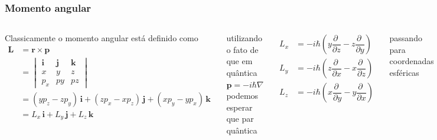 \documentclass[12pt,brazil,table]{beamer}
\begin{document}
  


\begin{frame}
  \frametitle{Momento angular}
  \fontsize{7pt}{11pt}\selectfont

  
  \begin{columns}[T]

   Classicamente o momento angular está definido como
   \vspace*{-0.5cm}
   \begin{align*}
            \mathbf{L} &= \mathbf{r} \times \mathbf{p}\\
            &= \begin{vmatrix}
              \mathbf{i} & \mathbf{j} & \mathbf{k}\\
              x & y & z\\
              p_x & py & pz
            \end{vmatrix}\\
            &= \left( yp_z - zp_y \right)\,\mathbf{i} + \left( zp_x - xp_z \right)\,\mathbf{j} + \left( xp_y - yp_x \right)\,\mathbf{k}\\
            &= L_x\,\mathbf{i} +L_y \,\mathbf{j} +L_z \,\mathbf{k}
    \end{align*}
    
    utilizando o fato de que em quântica $\mathbf{p} = -i\hbar \nabla$ podemos esperar que par quântica
    
    \[
     \begin{align*}
            L_x &= -i\hbar\left( y \dfrac{\partial \;}{\partial z}  - z \dfrac{\partial \;}{\partial y}\right)\\
            L_y &= -i\hbar\left( z \dfrac{\partial \;}{\partial x}  - x \dfrac{\partial \;}{\partial z}\right)\\
            L_z &= -i\hbar\left( x \dfrac{\partial \;}{\partial y}  - y \dfrac{\partial \;}{\partial x}\right)\\
          \end{align*}
    \]
          
    passando para coordenadas esféricas
  
    \vspace*{-1cm}
    

\end{columns}
\end{frame}
\end{document}
